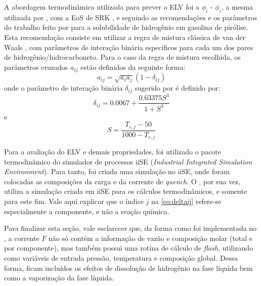 A abordagem termodinâmica utilizada para prever o ELV foi a $\phi_i$ -
$\phi_i$, a mesma utilizada por , com a EoS de SRK
\cite{Soave1972}, e seguindo as recomendações e os parâmetros do trabalho feito
por  para a solubilidade de hidrogênio em gasolina de
pirólise. Esta recomendação consiste em utilizar a regra de mistura clássica de
van der Waals \cite{VanderWaals1873}, com parâmetros de interação binária
específicos para cada um dos pares de hidrogênio/hidrocarboneto. Para o caso da
regra de mistura escolhida, os parâmetros cruzados $a_{ij}$ estão definidos
da seguinte forma\cite{Peng1976,Soave1972}:
\begin{equation}
a_{ij} = \sqrt{a_ia_j}(1-\delta_{ij})
\label{eq:parametroaij}
\end{equation}
onde o parâmetro de interação binária $\delta_{ij}$ sugerido por
 é definido por:
\begin{equation}
\delta_{ij} = \num{0,0067}+\dfrac{\num{0,63375}S^3}{1+S^3}
\label{eq:deltaij}
\end{equation}
e
\begin{equation}
S = \dfrac{T_{c,j}-\num{50}}{\num{1000}-T_{c,j}}
\label{eq:deltaij}
\end{equation}

Para a avaliação do ELV e demais propriedades, foi utilizado o pacote
termodinâmico do simulador de processos iiSE (\emph{Industrial Integrated
Simulation Environment}). Para tanto, foi criada uma simulação no iiSE, onde
foram colocadas as composições da carga e da corrente de \emph{quench}. O \emso,
por sua vez, utiliza a simulação criada em iiSE para os cálculos termodinâmicos,
e somente para este fim. Vale aqui explicar que o índice $j$ na
\autoref{eq:deltaij} refere-se especialmente a componente, e não a reação
química.

Para finalizar esta seção, vale esclarecer que, da forma como foi implementada
no \emso, a corrente $F$ não só contém a informação de vazão e composição molar
(total e por componente), mas também possui uma rotina de cálculo de
\emph{flash}, utilizando como variáveis de entrada pressão, temperatura e
composição global. Dessa forma, ficam incluídos os efeitos de dissolução de
hidrogênio na fase líquida bem como a vaporização da fase líquida.


